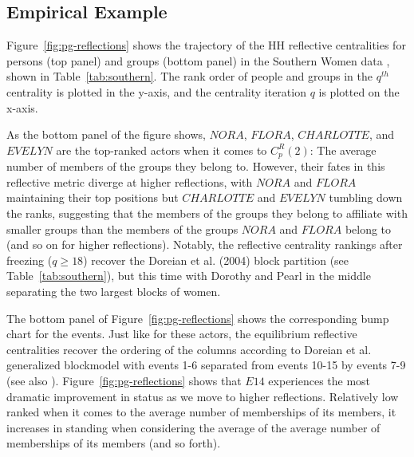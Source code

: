 \documentclass[a4paper,fleqn]{cas-sc}
\begin{document}
\subsection{Empirical Example}
Figure~\ref{fig:pg-reflections} shows the trajectory of the HH reflective centralities for persons (top panel) and groups (bottom panel) in the Southern Women data \citep{davis1941}, shown in Table~\ref{tab:southern}. The rank order of people and groups in the $q^{th}$ centrality is plotted in the y-axis, and the centrality iteration $q$ is plotted on the x-axis.

As the bottom panel of the figure shows, $NORA$, $FLORA$, $CHARLOTTE$, and $EVELYN$ are the top-ranked actors when it comes to $C^R_p(2)$:  The average number of members of the groups they belong to. However, their fates in this reflective metric diverge at higher reflections, with $NORA$ and $FLORA$ maintaining their top positions but $CHARLOTTE$ and $EVELYN$ tumbling down the ranks, suggesting that the members of the groups they belong to affiliate with smaller groups than the members of the groups $NORA$ and $FLORA$ belong to (and so on for higher reflections). Notably, the reflective centrality rankings after freezing ($q \geq 18$) recover the Doreian et al. (2004) block partition (see Table~\ref{tab:southern}), but this time with Dorothy and Pearl in the middle separating the two largest blocks of women. 

The bottom panel of Figure~\ref{fig:pg-reflections} shows the corresponding bump chart for the events. Just like for these actors, the equilibrium reflective centralities recover the ordering of the columns according to Doreian et al. generalized blockmodel with events 1-6 separated from events 10-15 by events 7-9 (see also \citet{kovacs2010generalized}). Figure~\ref{fig:pg-reflections} shows that $E14$ experiences the most dramatic improvement in status as we move to higher reflections. Relatively low ranked when it comes to the average number of memberships of its members, it increases in standing when considering the average of the average number of memberships of its members (and so forth). 
\end{document}
